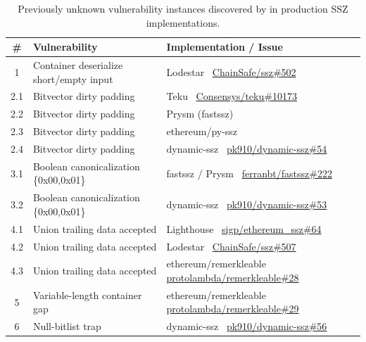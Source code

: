 \begin{table}[t]
\centering
\caption{Previously unknown vulnerability instances discovered by \tool in production SSZ implementations.}
\label{tab:0day-instances-report}
\small
\begin{tabular}{cll}
\toprule
\textbf{\#} & \textbf{Vulnerability} & \textbf{Implementation / Issue} \\
\midrule
1 & Container deserialize short/empty input & Lodestar~\cite{lodestar} \href{https://github.com/ChainSafe/ssz/issues/502}{ChainSafe/ssz\#502} \\
2.1 & Bitvector dirty padding & Teku~\cite{teku} \href{https://github.com/Consensys/teku/pull/10173}{Consensys/teku\#10173} \\
2.2 & Bitvector dirty padding & Prysm (fastssz)~\cite{prysm,fastssz} \\
2.3 & Bitvector dirty padding & ethereum/py-ssz~\cite{pyssz} \\
2.4 & Bitvector dirty padding & dynamic-ssz~\cite{dynamic_ssz} \href{https://github.com/pk910/dynamic-ssz/issues/54}{pk910/dynamic-ssz\#54} \\
3.1 & Boolean canonicalization \{0x00,0x01\} & fastssz / Prysm~\cite{fastssz,prysm} \href{https://github.com/ferranbt/fastssz/issues/222}{ferranbt/fastssz\#222} \\
3.2 & Boolean canonicalization \{0x00,0x01\} & dynamic-ssz~\cite{dynamic_ssz} \href{https://github.com/pk910/dynamic-ssz/issues/53}{pk910/dynamic-ssz\#53} \\
4.1 & Union trailing data accepted & Lighthouse~\cite{lighthouse} \href{https://github.com/sigp/ethereum_ssz/issues/64}{sigp/ethereum\_ssz\#64} \\
4.2 & Union trailing data accepted & Lodestar~\cite{lodestar} \href{https://github.com/ChainSafe/ssz/issues/507}{ChainSafe/ssz\#507} \\
4.3 & Union trailing data accepted & ethereum/remerkleable~\cite{remerkleable} \href{https://github.com/protolambda/remerkleable/issues/28}{protolambda/remerkleable\#28} \\
5 & Variable-length container gap & ethereum/remerkleable~\cite{remerkleable} \href{https://github.com/protolambda/remerkleable/issues/29}{protolambda/remerkleable\#29} \\
6 & Null-bitlist trap & dynamic-ssz~\cite{dynamic_ssz} \href{https://github.com/pk910/dynamic-ssz/issues/56}{pk910/dynamic-ssz\#56} \\
\bottomrule
\end{tabular}
\end{table}

